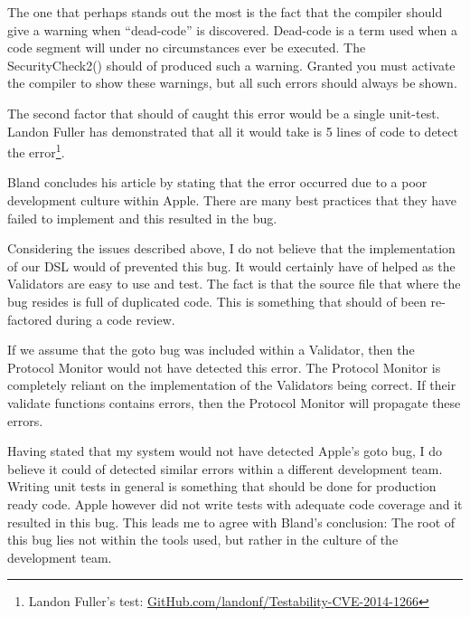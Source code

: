 The one that perhaps stands out the most is the fact that the compiler should give a warning when ``dead-code'' is discovered. Dead-code is a term used when a code segment will under no circumstances ever be executed. The SecurityCheck2() should of produced such a warning. Granted you must activate the compiler to show these warnings, but all such errors should always be shown.

The second factor that should of caught this error would be a single unit-test. Landon Fuller has demonstrated that all it would take is 5 lines of code to detect the error\footnote{Landon Fuller's test: \href{https://github.com/landonf/Testability-CVE-2014-1266}{GitHub.com/landonf/Testability-CVE-2014-1266}}.

Bland concludes his article by stating that the error occurred due to a poor development culture within Apple. There are many best practices that they have failed to implement and this resulted in the bug.

Considering the issues described above, I do not believe that the implementation of our DSL would of prevented this bug. It would certainly have of helped as the Validators are easy to use and test. The fact is that the source file that where the bug resides is full of duplicated code. This is something that should of been re-factored during a code review. 

If we assume that the goto bug was included within a Validator, then the Protocol Monitor would not have detected this error. The Protocol Monitor is completely reliant on the implementation of the Validators being correct. If their validate functions contains errors, then the Protocol Monitor will propagate these errors.


Having stated that my system would not have detected Apple's goto bug, I do believe it could of detected similar errors within a different development team. Writing unit tests in general is something that should be done for production ready code. Apple however did not write tests with adequate code coverage and it resulted in this bug. This leads me to agree with Bland's conclusion: The root of this bug lies not within the tools used, but rather in the culture of the development team.

\iffalse
